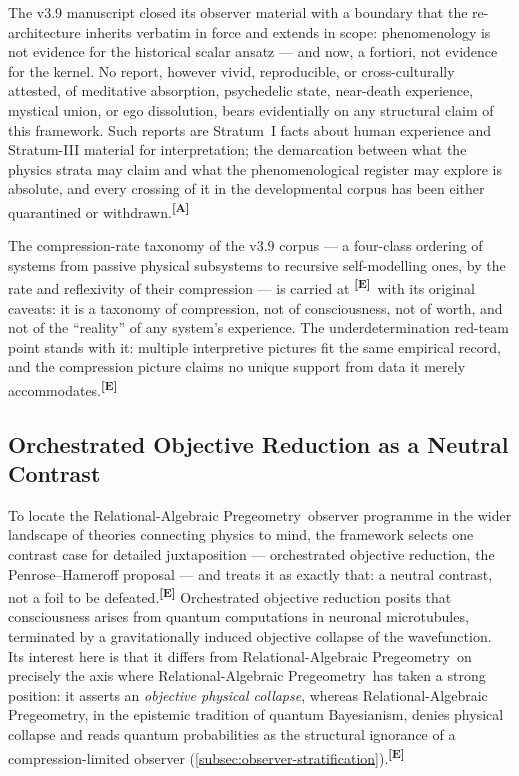 \documentclass[12pt,a4paper,twoside]{article}
\theoremstyle{plain}
\theoremstyle{definition}
\theoremstyle{remark}
\newcommand{\ProjectShort}{Relational-Algebraic Pregeometry}
\newcommand{\RAP}{\ProjectShort}
\newcommand{\catmark}[1]{\textsuperscript{\textsf{\textbf{[#1]}}}}
\begin{document}
The v3.9 manuscript closed its observer material with a boundary that
the re-architecture inherits verbatim in force and extends in scope:
phenomenology is not evidence for the historical scalar ansatz --- and now, a fortiori, not
evidence for the kernel. No report, however vivid, reproducible, or
cross-culturally attested, of meditative absorption, psychedelic state,
near-death experience, mystical union, or ego dissolution, bears
evidentially on any structural claim of this framework. Such reports are
Stratum~I facts about human experience and Stratum-III material for
interpretation; the demarcation between what the physics strata may
claim and what the phenomenological register may explore is absolute,
and every crossing of it in the developmental corpus has been either
quarantined or withdrawn.\catmark{A}

The compression-rate taxonomy of the v3.9 corpus --- a four-class
ordering of systems from passive physical subsystems to recursive
self-modelling ones, by the rate and reflexivity of their compression
--- is carried at \catmark{E}\ with its original caveats: it is a
taxonomy of compression, not of consciousness, not of worth, and not of
the ``reality'' of any system's experience. The underdetermination
red-team point stands with it: multiple interpretive pictures fit the
same empirical record, and the compression picture claims no unique
support from data it merely accommodates.\catmark{E}

\subsection{Orchestrated Objective Reduction as a Neutral Contrast}
\label{subsec:orch-or}

To locate the \RAP\ observer programme in the wider landscape of theories
connecting physics to mind, the framework selects one contrast case for
detailed juxtaposition --- orchestrated objective reduction, the
Penrose--Hameroff proposal --- and treats it as exactly that: a neutral
contrast, not a foil to be defeated.\catmark{E} Orchestrated objective
reduction posits that consciousness arises from quantum computations in
neuronal microtubules, terminated by a gravitationally induced objective
collapse of the wavefunction. Its interest here is that it differs from
\RAP\ on precisely the axis where \RAP\ has taken a strong position: it
asserts an \emph{objective physical collapse}, whereas \RAP, in the
epistemic tradition of quantum Bayesianism, denies physical collapse and
reads quantum probabilities as the structural ignorance of a
compression-limited observer (\cref{subsec:observer-stratification}).\catmark{E}
\end{document}
